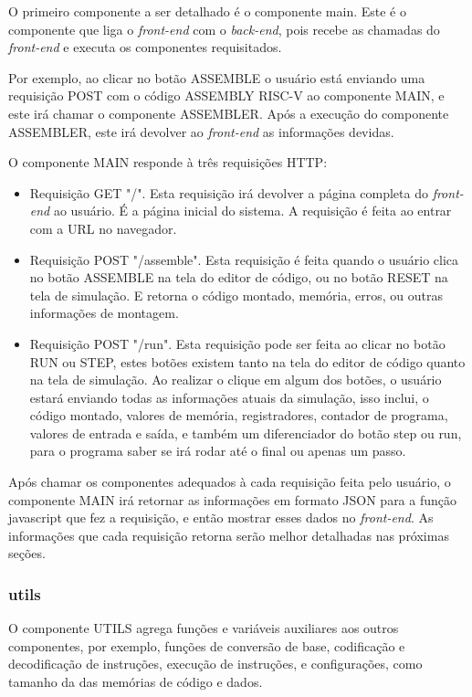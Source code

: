 			O primeiro componente a ser detalhado é o componente main. Este é o componente que liga o \textit{front-end} com o \textit{back-end}, pois recebe as chamadas do \textit{front-end} e executa os componentes requisitados. 

			Por exemplo, ao clicar no botão ASSEMBLE o usuário está enviando uma requisição POST com o código ASSEMBLY RISC-V ao componente MAIN, e este irá chamar o componente ASSEMBLER. Após a execução do componente ASSEMBLER, este irá devolver ao \textit{front-end} as informações devidas.

			O componente MAIN responde à três requisições HTTP:
			\begin{itemize}
				\item Requisição GET "/". Esta requisição irá devolver a página completa do \textit{front-end} ao usuário. É a página inicial do sistema. A requisição é feita ao entrar com a URL no navegador.
				\item Requisição POST "/assemble". Esta requisição é feita quando o usuário clica no botão ASSEMBLE na tela do editor de código, ou no botão RESET na tela de simulação. E retorna o código montado, memória, erros, ou outras informações de montagem.
				\item Requisição POST "/run". Esta requisição pode ser feita ao clicar no botão RUN ou STEP, estes botões existem tanto na tela do editor de código quanto na tela de simulação. Ao realizar o clique em algum dos botões, o usuário estará enviando todas as informações atuais da simulação, isso inclui, o código montado, valores de memória, registradores, contador de programa, valores de entrada e saída, e também um diferenciador do botão step ou run, para o programa saber se irá rodar até o final ou apenas um passo.
			\end{itemize}

			Após chamar os componentes adequados à cada requisição feita pelo usuário, o componente MAIN irá retornar as informações em formato JSON para a função javascript que fez a requisição, e então mostrar esses dados no \textit{front-end}. As informações que cada requisição retorna serão melhor detalhadas nas próximas seções.

		\subsubsection{utils}

			O componente UTILS agrega funções e variáveis auxiliares aos outros componentes, por exemplo, funções de conversão de base, codificação e decodificação de instruções, execução de instruções, e configurações, como tamanho da das memórias de código e dados.

